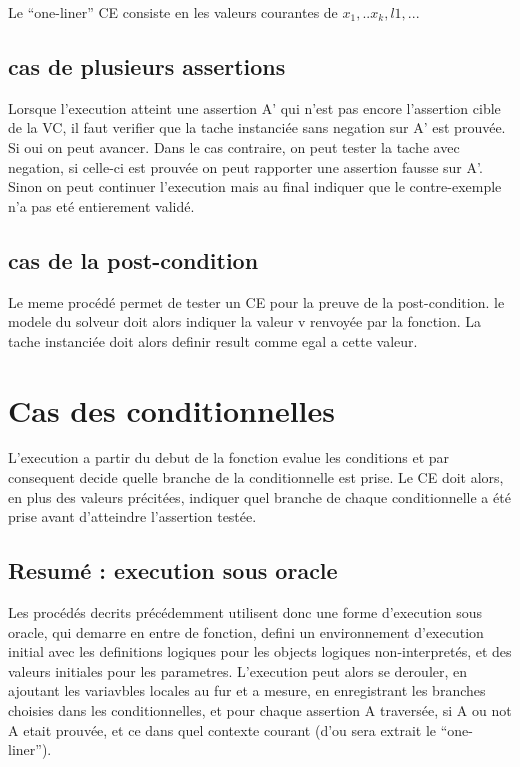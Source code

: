 \documentclass[a4paper,twoside]{article}
\begin{document}
Le ``one-liner'' CE consiste en les valeurs courantes de $x_1,..x_k,l1,...$

\subsection{cas de plusieurs assertions}

Lorsque l'execution atteint une assertion A' qui n'est pas encore l'assertion
cible de la VC, il faut verifier que la tache instanciée sans negation sur A'
est prouvée. Si oui on peut avancer. Dans le cas contraire, on peut tester la
tache avec negation, si celle-ci est prouvée on peut rapporter une assertion
fausse sur A'. Sinon on peut continuer l'execution mais au final indiquer que le
contre-exemple n'a pas eté entierement validé.


\subsection{cas de la post-condition}

Le meme procédé permet de tester un CE pour la preuve de la post-condition. le
modele du solveur doit alors indiquer la valeur v renvoyée par la fonction. La
tache instanciée doit alors definir result comme egal a cette valeur.

\section{Cas des conditionnelles}

L'execution a partir du debut de la fonction evalue les conditions et par
consequent decide quelle branche de la conditionnelle est prise. Le CE doit
alors, en plus des valeurs précitées, indiquer quel branche de chaque
conditionnelle a été prise avant d'atteindre l'assertion testée.

\subsection{Resumé : execution sous oracle}

Les procédés decrits précédemment utilisent donc une forme d'execution sous oracle,
qui demarre en entre de fonction, defini un environnement d'execution initial
avec les definitions logiques pour les objects logiques non-interpretés, et des
valeurs initiales pour les parametres. L'execution peut alors se derouler, en
ajoutant les variavbles locales au fur et a mesure, en enregistrant les branches
choisies dans les conditionnelles, et pour chaque assertion A traversée, si A ou
not A etait prouvée, et ce dans quel contexte courant (d'ou sera extrait le
``one-liner'').
\end{document}
